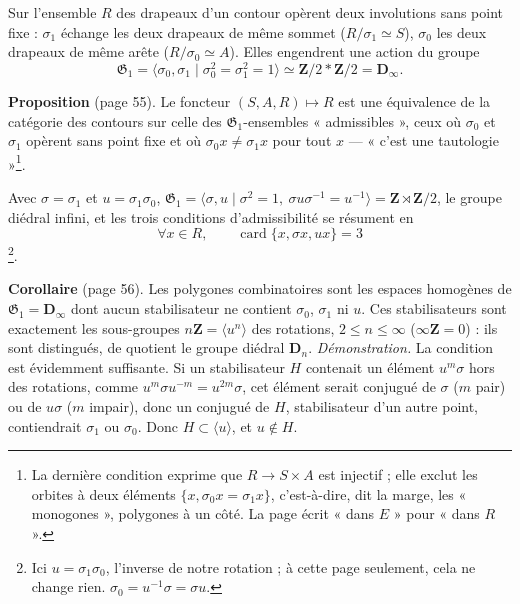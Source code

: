 \documentclass[11pt,a4paper]{article}
\begin{document}
Sur l'ensemble $R$ des drapeaux d'un contour opèrent deux involutions sans
point fixe : $\sigma_1$ échange les deux drapeaux de même sommet ($R/\sigma_1
\simeq S$), $\sigma_0$ les deux drapeaux de même arête ($R/\sigma_0 \simeq
A$). Elles engendrent une action du groupe
\[
  \mathfrak{G}_1 = \langle \sigma_0, \sigma_1 \mid \sigma_0^2 = \sigma_1^2 = 1
  \rangle \simeq \mathbf{Z}/2 * \mathbf{Z}/2 = \mathbf{D}_\infty .
\]

\textbf{Proposition} (page 55). Le foncteur $(S, A, R) \mapsto R$ est une
équivalence de la catégorie des contours sur celle des
$\mathfrak{G}_1$-ensembles « admissibles », ceux où $\sigma_0$ et $\sigma_1$
opèrent sans point fixe et où $\sigma_0 x \neq \sigma_1 x$ pour tout $x$ ---
« c'est une tautologie »\footnote{La dernière condition exprime que $R \to S
\times A$ est injectif ; elle exclut les orbites à deux éléments $\{x,
\sigma_0 x = \sigma_1 x\}$, c'est-à-dire, dit la marge, les « monogones »,
polygones à un côté. La page écrit « dans $E$ » pour « dans $R$ ».}.

Avec $\sigma = \sigma_1$ et $u = \sigma_1 \sigma_0$, $\mathfrak{G}_1 =
\langle \sigma, u \mid \sigma^2 = 1,\ \sigma u \sigma^{-1} = u^{-1} \rangle =
\mathbf{Z} \rtimes \mathbf{Z}/2$, le groupe diédral infini, et les trois
conditions d'admissibilité se résument en
\[
  \forall x \in R, \qquad \operatorname{card}\{x, \sigma x, u x\} = 3
\]
\footnote{Ici $u = \sigma_1\sigma_0$, l'inverse de notre rotation ; à cette
page seulement, cela ne change rien. $\sigma_0 = u^{-1}\sigma = \sigma u$.}.

\textbf{Corollaire} (page 56). Les polygones combinatoires sont les espaces
homogènes de $\mathfrak{G}_1 = \mathbf{D}_\infty$ dont aucun stabilisateur ne
contient $\sigma_0$, $\sigma_1$ ni $u$. Ces stabilisateurs sont exactement les
sous-groupes $n\mathbf{Z} = \langle u^n \rangle$ des rotations, $2 \leq n \leq
\infty$ ($\infty\mathbf{Z} = 0$) : ils sont distingués, de quotient le groupe
diédral $\mathbf{D}_n$. \emph{Démonstration.} La condition est évidemment
suffisante. Si un stabilisateur $H$ contenait un élément $u^m \sigma$ hors des
rotations, comme $u^m \sigma u^{-m} = u^{2m}\sigma$, cet élément serait
conjugué de $\sigma$ ($m$ pair) ou de $u\sigma$ ($m$ impair), donc un
conjugué de $H$, stabilisateur d'un autre point, contiendrait $\sigma_1$ ou
$\sigma_0$. Donc $H \subset \langle u \rangle$, et $u \notin H$.
\end{document}
